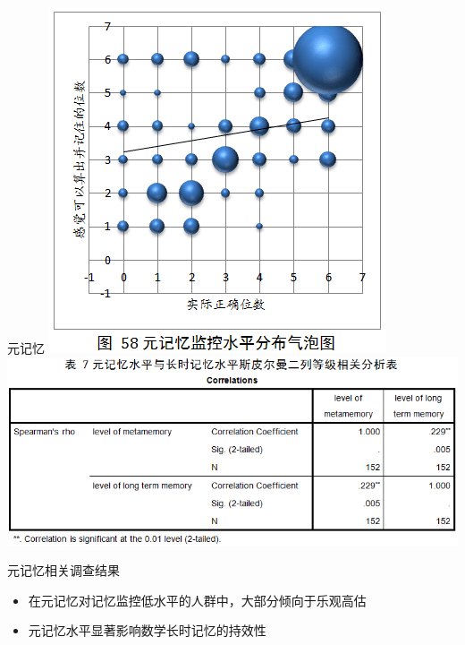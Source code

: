 \documentclass[serif]{beamer}
\begin{document}
    \begin{frame}{元记忆}
          \includegraphics[scale=0.4]{metamemorybubble.png} 
          \includegraphics[scale=0.43]{metamemory.png}
          \begin{block}{元记忆相关调查结果}
          	\begin{itemize}
          		\item  \footnotesize {在元记忆对记忆监控低水平的人群中，大部分倾向于乐观高估}
          		\item  \footnotesize {元记忆水平显著影响数学长时记忆的持效性}
          	\end{itemize}
          \end{block} 
    \end{frame}
    
\end{document}
